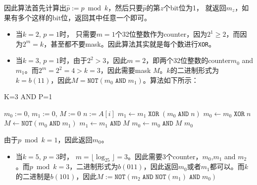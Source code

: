 \par
因此算法首先计算出$\hat{p}:=p\bmod k$，然后只要$\hat{p}$的第$z$个bit位为1， 就返回$m_z$，如果有多个这样的bit位，返回其中任意一个即可。
\par
\begin{itemize}
\item 当$k=2$, $p=1$时， 只需要$m=1$个32位整数作为counter，因为$2^1\geq2$，而因为$2^m=k$，甚至都不要mask。因此算法其实就是每个数进行\texttt{XOR}。
\item 当$k=3$, $p=1$时，由于$2^2>3$，因此$m=2$，即两个32位整数的counter$m_0$ and $m_1$。而$2^m=2^2=4>k=3$，因此需要mask $M$。$k$的二进制形式为$k=b(11)$，因此$M = \texttt{NOT}(m_0\;\texttt{AND}\;m_1)$。算法如下所示：
\end{itemize}
\setcounter{algorithm}{0}
\begin{algorithm}[H]
\caption{K=3 AND P=1}
\begin{algorithmic}[1]
\State $m_0:=0$, $m_1:=0$, $M:=0$
\State $n:=A[i]$
\State $m_1\gets m_1\;\texttt{XOR}\;(m_0\;\texttt{AND}\;n)$
\State $m_0\gets m_0\;\texttt{XOR}\;n$
\State $M\gets \texttt{NOT}(m_0\;\texttt{AND}\;m_1)$
\State $m_1\gets m_1\;\texttt{AND}\;M$
\State $m_0\gets m_0\;\texttt{AND}\;M$
\EndFor
\State \Return $m_0$
\EndProcedure
\end{algorithmic}
\end{algorithm}
由于$p\bmod k=1$，因此返回$m_0$。
\begin{itemize}
\item 当$k=5$, $p=3$时， $m=\lfloor\log_25\rfloor=3$。因此需要3个counter，$m_0$,$m_1$ and $m_2$。而$p\bmod k=3$，二进制形式为$b(011)$，因此返回$m_0$或者$m_1$都可以。而$k$的二进制是$b(101)$，因此$M:=\texttt{NOT}(m_2\;\texttt{AND}\;\texttt{NOT}(m_1)\;\texttt{AND}\;m_0)$
\end{itemize}

